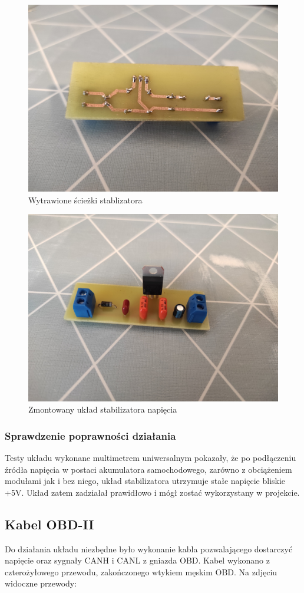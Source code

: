 \documentclass[10pt,a4paper]{article}
\begin{document}
		\begin{figure}
			\centering
			\includegraphics[width=0.7\linewidth]{wytrawione_ścieżki}
			\caption[Wytrawione ścieżki stablizatora]{Wytrawione ścieżki stablizatora}
			\label{fig:wytrawionesciezki}
		\end{figure}
		
		\begin{figure}
			\centering
			\includegraphics[width=0.7\linewidth]{pcb_gotowe}
			\caption[Zmontowany układ]{Zmontowany układ stabilizatora napięcia}
			\label{fig:pcbgotowe}
		\end{figure}
				\subsubsection{Sprawdzenie poprawności działania}
				Testy układu wykonane multimetrem uniwersalnym pokazały, że po podłączeniu źródła napięcia w postaci akumulatora samochodowego, zarówno z obciążeniem modułami jak i bez niego, układ stabilizatora utrzymuje stałe napięcie bliskie +5V. Układ zatem zadziałał prawidłowo i mógł zostać wykorzystany w projekcie.
		\subsection{Kabel OBD-II}
		Do działania układu niezbędne było wykonanie kabla pozwalającego dostarczyć napięcie oraz sygnały CANH i CANL z gniazda OBD. Kabel wykonano z czterożyłowego przewodu, zakończonego wtykiem męskim OBD. Na zdjęciu widoczne przewody: 
		
\end{document}
